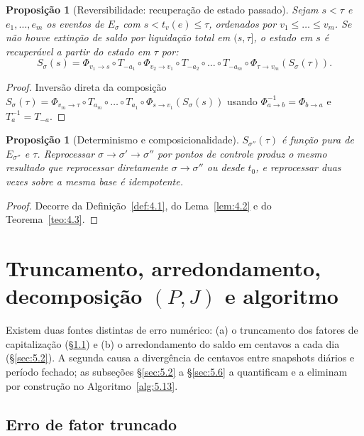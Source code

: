 \documentclass[11pt, a4paper]{article}
\theoremstyle{definition}
\theoremstyle{plain}
\newtheorem{proposicao}[definicao]{Proposição}
\theoremstyle{remark}
\begin{document}
\begin{proposicao}[Reversibilidade: recuperação de estado passado]\label{prop:4.6}
Sejam $s < \tau$ e $e_1, \dots, e_m$ os eventos de $E_\sigma$ com $s < t_v(e) \le \tau$, ordenados por $v_1 \le \dots \le v_m$. Se não houve extinção de saldo por liquidação total em $(s, \tau]$, o estado em $s$ é recuperável a partir do estado em $\tau$ por:
\[
S_\sigma(s) = \Phi_{v_1 \to s} \circ T_{-a_1} \circ \Phi_{v_2 \to v_1} \circ T_{-a_2} \circ \dots \circ T_{-a_m} \circ \Phi_{\tau \to v_m}(S_\sigma(\tau)).
\]
\end{proposicao}
\begin{proof}
Inversão direta da composição $S_\sigma(\tau) = \Phi_{v_m \to \tau} \circ T_{a_m} \circ \dots \circ T_{a_1} \circ \Phi_{s \to v_1}(S_\sigma(s))$ usando $\Phi_{a \to b}^{-1} = \Phi_{b \to a}$ e $T_a^{-1} = T_{-a}$.
\end{proof}

\begin{proposicao}[Determinismo e composicionalidade]\label{prop:4.7}
$S_{\sigma''}(\tau)$ é função pura de $E_{\sigma''}$ e $\tau$. Reprocessar $\sigma \to \sigma' \to \sigma''$ por pontos de controle produz o mesmo resultado que reprocessar diretamente $\sigma \to \sigma''$ ou desde $t_0$, e reprocessar duas vezes sobre a mesma base é idempotente.
\end{proposicao}
\begin{proof}
Decorre da Definição~\ref{def:4.1}, do Lema~\ref{lem:4.2} e do Teorema~\ref{teo:4.3}.
\end{proof}

\section{Truncamento, arredondamento, decomposição $(P, J)$ e algoritmo}\label{sec:5}

Existem duas fontes distintas de erro numérico: (a) o truncamento dos fatores de capitalização (\S\ref{sec:5.1}) e (b) o arredondamento do saldo em centavos a cada dia (\S\ref{sec:5.2}). A segunda causa a divergência de centavos entre snapshots diários e período fechado; as subseções \S\ref{sec:5.2} a \S\ref{sec:5.6} a quantificam e a eliminam por construção no Algoritmo~\ref{alg:5.13}.

\subsection{Erro de fator truncado}\label{sec:5.1}
\end{document}
